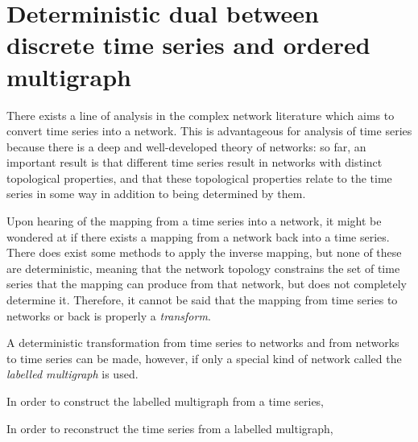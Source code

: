 \documentclass[12pt]{article}
\begin{document}

\section{Deterministic dual between discrete time series and ordered multigraph}

There exists a line of analysis in the complex network literature which aims to convert time series into a network. This is advantageous for analysis of time series because there is a deep and well-developed theory of networks: so far, an important result is that different time series result in networks with distinct topological properties, and that these topological properties relate to the time series in some way in addition to being determined by them. %


Upon hearing of the mapping from a time series into a network, it might be wondered at if there exists a mapping from a network back into a time series. There does exist some methods to apply the inverse mapping, but none of these are deterministic, meaning that the network topology constrains the set of time series that the mapping can produce from that network, but does not completely determine it. Therefore, it cannot be said that the mapping from time series to networks or back is properly a \emph{transform}.%

A deterministic transformation from time series to networks and from networks to time series can be made, however, if only a special kind of network called the \emph{labelled multigraph} is used. %



In order to construct the labelled multigraph from a time series,


In order to reconstruct the time series from a labelled multigraph,



%

%
%

\end{document}
